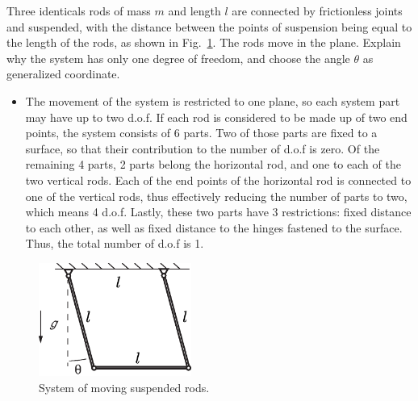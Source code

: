 \documentclass[11pt,a4paper]{report}
\newcounter{excount}[chapter]
\newenvironment{exercise}[1][]{\addtocounter{excount}{1} \noindent {\bf Problem
    \arabic{excount} \ \ #1}\hspace{2mm}}{\vspace{4mm}}
\begin{document}
\newpage
\begin{exercise}
Three identicals rods of mass $m$ and length $l$ are connected by frictionless joints and suspended,  with the distance between the points of suspension being equal to the length of the rods, as shown in Fig.~\ref{fig:rods}. The rods move in the plane. Explain why the system has only one degree of freedom, and choose the angle $\theta$ as generalized coordinate.
\begin{itemize}
\item The movement of the system is restricted to one plane, so each system part may have up to two d.o.f. If each rod is considered to be made up of two end points, the system consists of 6 parts. Two of those parts are fixed to a surface, so that their contribution to the number of d.o.f is zero. Of the remaining 4 parts, 2 parts belong the horizontal rod, and one to each of the two vertical rods. Each of the end points of the horizontal rod is connected to one of the vertical rods, thus effectively reducing the number of parts to two, which means 4 d.o.f. Lastly, these two parts have 3 restrictions: fixed distance to each other, as well as fixed distance to the hinges fastened to the surface. Thus, the total number of d.o.f is 1.
\end{itemize}


\begin{figure}[h!]
\begin{center}
\includegraphics[width=5cm]{ThreeRods.eps}
\end{center}
\caption{System of moving suspended rods.}
\label{fig:rods}
\end{figure}


\end{exercise}
\end{document}
